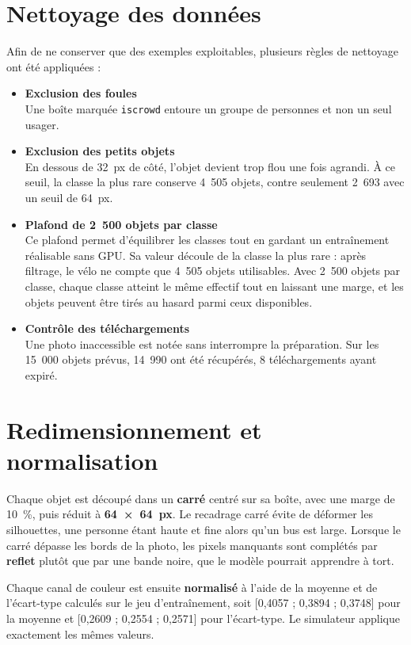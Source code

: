 \section{Nettoyage des données}
\label{sec:nettoyage}

Afin de ne conserver que des exemples exploitables, plusieurs règles de nettoyage ont été appliquées :

\begin{itemize}
  \item \textbf{Exclusion des foules}\\
  Une boîte marquée \texttt{iscrowd} entoure un groupe de personnes et non un seul usager.
  \item \textbf{Exclusion des petits objets}\\
  En dessous de 32~px de côté, l'objet devient trop flou une fois agrandi. À ce seuil, la classe la plus rare conserve 4~505 objets, contre seulement 2~693 avec un seuil de 64~px.
  \item \textbf{Plafond de 2~500 objets par classe}\\
  Ce plafond permet d'équilibrer les classes tout en gardant un entraînement réalisable sans GPU. Sa valeur découle de la classe la plus rare : après filtrage, le vélo ne compte que 4~505 objets utilisables. Avec 2~500 objets par classe, chaque classe atteint le même effectif tout en laissant une marge, et les objets peuvent être tirés au hasard parmi ceux disponibles.
  \item \textbf{Contrôle des téléchargements}\\
  Une photo inaccessible est notée sans interrompre la préparation. Sur les 15~000 objets prévus, 14~990 ont été récupérés, 8 téléchargements ayant expiré.
\end{itemize}

\section{Redimensionnement et normalisation}

Chaque objet est découpé dans un \textbf{carré} centré sur sa boîte, avec une marge de 10~\%, puis réduit à \textbf{64~×~64~px}. Le recadrage carré évite de déformer les silhouettes, une personne étant haute et fine alors qu'un bus est large. Lorsque le carré dépasse les bords de la photo, les pixels manquants sont complétés par \textbf{reflet} plutôt que par une bande noire, que le modèle pourrait apprendre à tort.

Chaque canal de couleur est ensuite \textbf{normalisé} à l'aide de la moyenne et de l'écart-type calculés sur le jeu d'entraînement, soit [0,4057 ; 0,3894 ; 0,3748] pour la moyenne et [0,2609 ; 0,2554 ; 0,2571] pour l'écart-type. Le simulateur applique exactement les mêmes valeurs.

